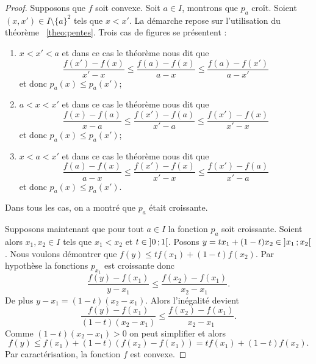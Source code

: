 \begin{proof}
  Supposons que \(f\) soit convexe. Soit \(a \in I\), montrons que \(p_a\) croît. Soient \((x,x') \in I\setminus\{a\}^2\) tels que \(x < x'\). La démarche repose sur l'utilisation du théorème~
\ref{theo:pentes}. Trois cas de figures se présentent :
  \begin{enumerate}
  \item \(x < x' < a\) et dans ce cas le théorème nous dit que
    \begin{equation}
      \frac{f(x')-f(x)}{x'-x} \leqslant \frac{f(a)-f(x)}{a-x} \leqslant \frac{f(a)-f(x')}{a-x'}
    \end{equation}
    et donc \(p_a(x) \leqslant p_a(x')\);
  \item \(a < x < x'\) et dans ce cas le théorème nous dit que
    \begin{equation}
      \frac{f(x)-f(a)}{x-a} \leqslant \frac{f(x')-f(a)}{x'-a} \leqslant \frac{f(x')-f(x)}{x'-x}
    \end{equation}
    et donc \(p_a(x) \leqslant p_a(x')\);
  \item \(x<a<x'\)  et dans ce cas le théorème nous dit que
    \begin{equation}
      \frac{f(a)-f(x)}{a-x} \leqslant \frac{f(x')-f(x)}{x'-x} \leqslant \frac{f(x')-f(a)}{x'-a}
    \end{equation}
    et donc \(p_a(x) \leqslant p_a(x')\).
  \end{enumerate}
  Dans tous les cas, on a montré que \(p_a\) était croissante.

  Supposons maintenant que pour tout \(a \in I\) la fonction \(p_a\) soit croissante. Soient alors \(x_1,x_2 \in I\) tels que \(x_1<x_2\) et \(t \in \left] 0 \, ;  1 \right[\). Posons \(y=tx_1+(1-t)x_2 \in \left] x_1 \, ;  x_2 \right[\). Nous voulons démontrer que \(f(y) \leqslant tf(x_1)+(1-t)f(x_2)\). Par hypothèse la fonctions \(p_{x_1}\) est croissante donc 
  \begin{equation}
    \frac{f(y)-f(x_1)}{y-x_1} \leqslant \frac{f(x_2)-f(x_1)}{x_2-x_1}.
  \end{equation}
  De plus \(y-x_1=(1-t)(x_2-x_1)\). Alors l'inégalité devient
  \begin{equation}
    \frac{f(y)-f(x_1)}{(1-t)(x_2-x_1)} \leqslant \frac{f(x_2)-f(x_1)}{x_2-x_1}.
  \end{equation}
  Comme \((1-t)(x_2-x_1)>0\) on peut simplifier et alors
  \begin{equation}
    f(y) \leqslant f(x_1)+(1-t)(f(x_2)-f(x_1)) = tf(x_1)+(1-t)f(x_2).
  \end{equation}
  Par caractérisation, la fonction \(f\) est convexe.
\end{proof}

